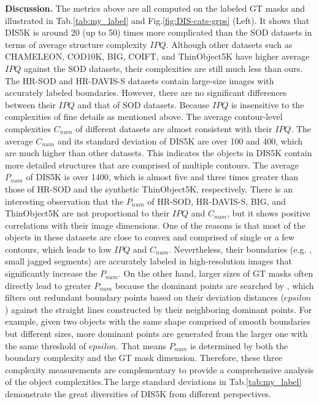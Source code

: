 \textbf{Discussion.} The metrics above are all computed on the labeled GT masks and illustrated in Tab.\ref{tab:my_label} and Fig.\ref{fig:DIS-cats-grps} (Left). It shows that DIS5K is around 20 (up to 50) times more complicated than the SOD datasets in terms of average structure complexity $IPQ$. Although other datasets such as CHAMELEON, COD10K, BIG, COIFT, and ThinObject5K have higher average $IPQ$ against the SOD datasets, their complexities are still much less than ours. The HR-SOD and HR-DAVIS-S datasets contain large-size images with accurately labeled boundaries. However, there are no significant differences between their $IPQ$ and that of SOD datasets. Because $IPQ$ is insensitive to the complexities of fine details as mentioned above. The average contour-level complexities $C_{num}$ of different datasets are almost consistent with their $IPQ$. The average $C_{num}$ and its standard deviation of DIS5K are over 100 and 400, which are much higher than other datasets. This indicates the objects in DIS5K contain more detailed structures that are comprised of multiple contours. The average $P_{num}$ of DIS5K is over 1400, which is almost five and three times greater than those of HR-SOD and the synthetic ThinObject5K, respectively. There is an interesting observation that the $P_{num}$ of HR-SOD, HR-DAVIS-S, BIG, and ThinObject5K are not proportional to their $IPQ$ and $C_{num}$, but it shows positive correlations with their image dimensions. One of the reasons is that most of the objects in these datasets are close to convex and comprised of single or a few contours, which leads to low $IPQ$ and $C_{num}$. Nevertheless, their boundaries (e.g. , small jagged segments) are accurately labeled in high-resolution images that significantly increase the $P_{num}$. On the other hand, larger sizes of GT masks often directly lead to greater $P_{num}$ because the dominant points are searched by \cite{DBLP:journals/cvgip/Ramer72}, which filters out redundant boundary points based on their deviation distances ($epsilon$) against the straight lines constructed by their neighboring dominant points. For example, given two objects with the same shape comprised of smooth boundaries but different sizes, more dominant points are generated from the larger one with the same threshold of $epsilon$. That means $P_{num}$ is determined by both the boundary complexity and the GT mask dimension. Therefore, these three complexity measurements are complementary to provide a comprehensive analysis of the object complexities.The large standard deviations in Tab.\ref{tab:my_label} demonstrate the great diversities of DIS5K from different perspectives. 

